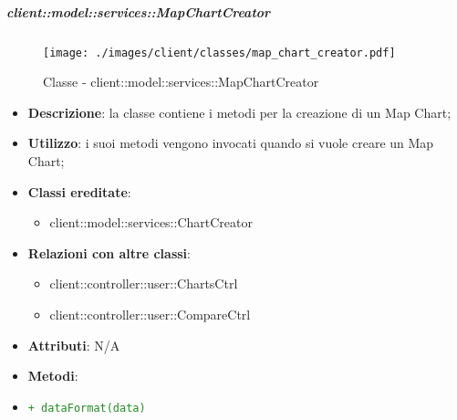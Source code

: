 		\subparagraph{client::model::services::MapChartCreator} %
		\label{subp:mapchartcreator}
			\begin{figure}[htbp]
				\centering
				\centerline{\texttt{[image: ./images/client/classes/map\_chart\_creator.pdf]}}
				\caption{Classe - client::model::services::MapChartCreator}
			\end{figure}
			\begin{itemize}
				\item \textbf{Descrizione}: la classe contiene i metodi per la creazione di un Map Chart;
				\item \textbf{Utilizzo}: i suoi metodi vengono invocati quando si vuole creare un Map Chart;
				\item \textbf{Classi ereditate}:
					\begin{itemize}
						\item client::model::services::ChartCreator
					\end{itemize}
				\item \textbf{Relazioni con altre classi}:
					\begin{itemize}
						\item client::controller::user::ChartsCtrl
						\item client::controller::user::CompareCtrl
					\end{itemize}
				\item \textbf{Attributi}: N/A
				\item \textbf{Metodi}: 
					\item \textcolor{forestgreen}{\texttt{+ dataFormat(data)}}
			\end{itemize}

